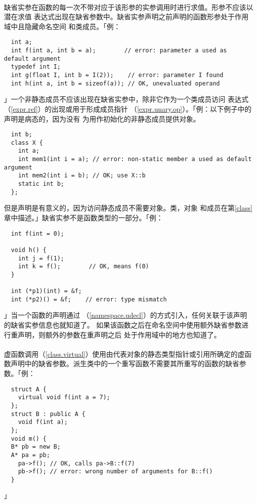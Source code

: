 \paragraph{}
缺省实参在函数的每一次不带对应于该形参的实参调用时进行求值。形参不应该以潜在求值
表达式出现在缺省参数中。缺省实参声明之前声明的函数形参处于作用域中且隐藏命名空间
和类成员。「例：
\begin{lstlisting}
  int a;
  int f(int a, int b = a);        // error: parameter a used as default argument 
  typedef int I;
  int g(float I, int b = I(2));    // error: parameter I found
  int h(int a, int b = sizeof(a)); // OK, unevaluated operand
\end{lstlisting}」一个非静态成员不应该出现在缺省实参中，除非它作为一个类成员访问
表达式（\ref{expr.ref}）的出现或用于形成成员指针
（\ref{expr.unary.op}）。「例：以下例子中的声明是病态的，因为没有
为用作初始化的非静态成员提供对象。
\begin{lstlisting}
  int b;
  class X {
    int a;
    int mem1(int i = a); // error: non-static member a used as default argument
    int mem2(int i = b); // OK; use X::b 
    static int b;
  };
\end{lstlisting}
但是声明是有意义的，因为访问静态成员不需要对象。类，对象
和成员在第\ref{class}章中描述。」缺省实参不是函数类型的一部分。「例：
\begin{lstlisting}
  int f(int = 0);

  void h() {
    int j = f(1);
    int k = f();        // OK, means f(0)
  }

  int (*p1)(int) = &f;
  int (*p2)() = &f;    // error: type mismatch
\end{lstlisting}」当一个函数的声明通过
（\ref{namespace.udecl}）的方式引入，任何关联于该声明的缺省实参信息也就知道了。
如果该函数之后在命名空间中使用额外缺省参数进行重声明，则额外的参数在重声明之后
处于作用域中的地方也知道了。

\paragraph{}
虚函数调用（\ref{class.virtual}）使用由代表对象的静态类型指针或引用所确定的虚函
数声明中的缺省参数。派生类中的一个重写函数不需要其所重写的函数的缺省参数。「例：
\begin{lstlisting}
  struct A {
    virtual void f(int a = 7);
  };
  struct B : public A {
    void f(int a);
  };
  void m() {
  B* pb = new B;
  A* pa = pb;
    pa->f(); // OK, calls pa->B::f(7)
    pb->f(); // error: wrong number of arguments for B::f()
  }
\end{lstlisting}」

